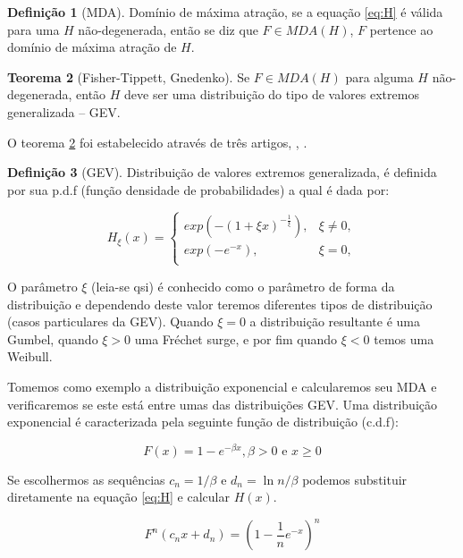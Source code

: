 \documentclass[review]{elsarticle}
\theoremstyle{definition}
\newtheorem{teor}{Teorema}%
\newtheorem{defi}[teor]{Definição}
\begin{document}
\begin{defi}[MDA] \label{defi:MDA}
	Domínio de máxima atração, se a equação \eqref{eq:H} é válida para uma $H$ não-degenerada, então se diz que $F \in MDA(H)$, $F$ pertence ao domínio de máxima atração de $H$.
\end{defi}

\begin{teor}[Fisher-Tippett, Gnedenko] \label{teor:fisher-tippett}
	Se $F \in MDA(H)$ para alguma $H$ não-degenerada, então $H$ deve ser uma distribuição do tipo de valores extremos generalizada – GEV.
\end{teor}
O teorema \ref{teor:fisher-tippett} foi estabelecido através de três artigos, \cite{Fisher1928}, \cite{Gnedenko1941, Gnedenko1943}.

\begin{defi}[GEV] \label{defi:GEV}
	Distribuição de valores extremos generalizada, é definida por sua p.d.f (função densidade de probabilidades) a qual é dada por:
\end{defi}

\begin{equation}
\label{eq:GEV}
H_\xi(x) = 
\begin{cases}
exp(-(1+\xi x)^{-\frac{1}{\xi}}), & \xi \neq 0,\\
exp(-e^{-x}), & \xi = 0,\\
\end{cases}
\end{equation}

O parâmetro $\xi$ (leia-se qsi) é conhecido como o parâmetro de forma da distribuição e dependendo deste valor teremos diferentes tipos de distribuição (casos particulares da GEV). Quando $\xi=0$ a distribuição resultante é uma Gumbel, quando  $\xi>0$ uma Fréchet surge, e por fim quando $\xi<0$ temos uma Weibull.

Tomemos como exemplo a distribuição exponencial e calcularemos seu MDA e verificaremos se este está entre umas das distribuições GEV.
Uma distribuição exponencial é caracterizada pela seguinte função de distribuição (c.d.f):

\begin{equation*}
F(x)=1-e^{- \beta x}, \beta > 0 \text{ e } x \geq 0
\end{equation*}

Se escolhermos as sequências $c_n=1/\beta$ e $d_n=\ln n /\beta$ podemos substituir diretamente na equação \eqref{eq:H} e calcular $H(x)$.

\begin{equation*}
F^n \left(c_nx+d_n \right)=\left(1-\frac{1}{n}e^{-x} \right)^n
\end{equation*}
\end{document}
